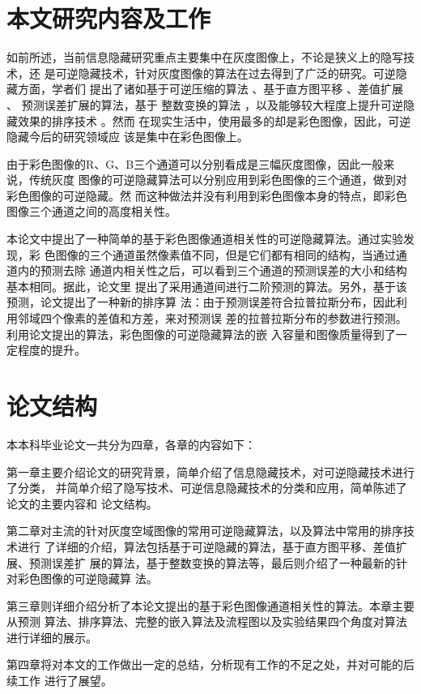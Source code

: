 \section{本文研究内容及工作}
\label{s:contribution_of_this_thesis}
如前所述，当前信息隐藏研究重点主要集中在灰度图像上，不论是狭义上的隐写技术，还
是可逆隐藏技术，针对灰度图像的算法在过去得到了广泛的研究。可逆隐藏方面，学者们
提出了诸如基于可逆压缩的算法\cite{fridrich2001invertible}\cite{fridrich1900lossless}
\cite{celik2005lossless}、基于直方图平移\cite{ni2006reversible}
\cite{lee2006reversiblee}\cite{li2013general}、差值扩展\cite{tian2003reversible}
\cite{alattar2003reversible}\cite{alattar2004reversible}\cite{alattar2004reversible}、
预测误差扩展的算法\cite{thodi2007expansion}\cite{fallahpour2008reversible}，基于
整数变换的算法\cite{coltuc2007very}\cite{chen2010reversible}\cite{wang2010efficient}
\cite{peng2012adaptive}，以及能够较大程度上提升可逆隐藏效果的排序技术
\cite{kamstra2005reversible}\cite{sachnev2009reversible}\cite{li2013high}。然而
在现实生活中，使用最多的却是彩色图像，因此，可逆隐藏今后的研究领域应
该是集中在彩色图像上。
\par
由于彩色图像的R、G、B三个通道可以分别看成是三幅灰度图像，因此一般来说，传统灰度
图像的可逆隐藏算法可以分别应用到彩色图像的三个通道，做到对彩色图像的可逆隐藏。然
而这种做法并没有利用到彩色图像本身的特点，即彩色图像三个通道之间的高度相关性。
\par
本论文中提出了一种简单的基于彩色图像通道相关性的可逆隐藏算法。通过实验发现，彩
色图像的三个通道虽然像素值不同，但是它们都有相同的结构，当通过通道内的预测去除
通道内相关性之后，可以看到三个通道的预测误差的大小和结构基本相同。据此，论文里
提出了采用通道间进行二阶预测的算法。另外，基于该预测，论文提出了一种新的排序算
法：由于预测误差符合拉普拉斯分布，因此利用邻域四个像素的差值和方差，来对预测误
差的拉普拉斯分布的参数进行预测。利用论文提出的算法，彩色图像的可逆隐藏算法的嵌
入容量和图像质量得到了一定程度的提升。\\



\section{论文结构}
\label{s:thesis_structure}
本本科毕业论文一共分为四章，各章的内容如下：
\par
第一章主要介绍论文的研究背景，简单介绍了信息隐藏技术，对可逆隐藏技术进行了分类，
并简单介绍了隐写技术、可逆信息隐藏技术的分类和应用，简单陈述了论文的主要内容和
论文结构。
\par
第二章对主流的针对灰度空域图像的常用可逆隐藏算法，以及算法中常用的排序技术进行
了详细的介绍，算法包括基于可逆隐藏的算法，基于直方图平移、差值扩展、预测误差扩
展的算法，基于整数变换的算法等，最后则介绍了一种最新的针对彩色图像的可逆隐藏算
法。
\par
第三章则详细介绍分析了本论文提出的基于彩色图像通道相关性的算法。本章主要从预测
算法、排序算法、完整的嵌入算法及流程图以及实验结果四个角度对算法进行详细的展示。
\par
第四章将对本文的工作做出一定的总结，分析现有工作的不足之处，并对可能的后续工作
进行了展望。\\

